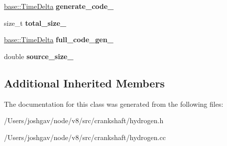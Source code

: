 \begin{DoxyCompactItemize}
\item 
\hyperlink{classv8_1_1base_1_1_time_delta}{base\+::\+Time\+Delta} {\bfseries generate\+\_\+code\+\_\+}\hypertarget{classv8_1_1internal_1_1_h_statistics_af551933ffa9303e4ef770e1dca7dc0c2}{}\label{classv8_1_1internal_1_1_h_statistics_af551933ffa9303e4ef770e1dca7dc0c2}

\item 
size\+\_\+t {\bfseries total\+\_\+size\+\_\+}\hypertarget{classv8_1_1internal_1_1_h_statistics_a9de8dd08cab4f4172ee8ea968d7dde8c}{}\label{classv8_1_1internal_1_1_h_statistics_a9de8dd08cab4f4172ee8ea968d7dde8c}

\item 
\hyperlink{classv8_1_1base_1_1_time_delta}{base\+::\+Time\+Delta} {\bfseries full\+\_\+code\+\_\+gen\+\_\+}\hypertarget{classv8_1_1internal_1_1_h_statistics_abd69a2bf3cf90afbe44b91c80c17ebec}{}\label{classv8_1_1internal_1_1_h_statistics_abd69a2bf3cf90afbe44b91c80c17ebec}

\item 
double {\bfseries source\+\_\+size\+\_\+}\hypertarget{classv8_1_1internal_1_1_h_statistics_a3c33a67bfd06e5aa7de5174efefce1e0}{}\label{classv8_1_1internal_1_1_h_statistics_a3c33a67bfd06e5aa7de5174efefce1e0}

\end{DoxyCompactItemize}
\subsection*{Additional Inherited Members}


The documentation for this class was generated from the following files\+:\begin{DoxyCompactItemize}
\item 
/\+Users/joshgav/node/v8/src/crankshaft/hydrogen.\+h\item 
/\+Users/joshgav/node/v8/src/crankshaft/hydrogen.\+cc\end{DoxyCompactItemize}
